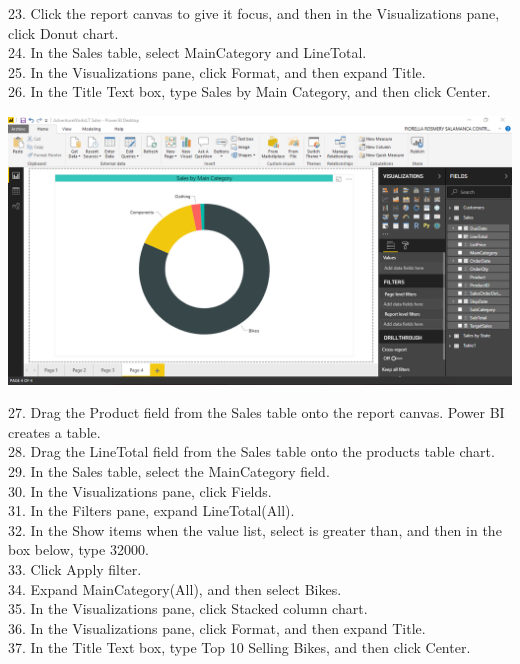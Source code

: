 23. Click the report canvas to give it focus, and then in the Visualizations pane, click Donut chart.\\
24. In the Sales table, select MainCategory and LineTotal.\\
25. In the Visualizations pane, click Format, and then expand Title.\\
26. In the Title Text box, type Sales by Main Category, and then click Center.\\

	\begin{center}
	\includegraphics[width=17cm]{./Imagenes/Ejercicio2/Tarea1/4}
	\end{center}	

27. Drag the Product field from the Sales table onto the report canvas. Power BI creates a table.\\
28. Drag the LineTotal field from the Sales table onto the products table chart.\\
29. In the Sales table, select the MainCategory field.\\
30. In the Visualizations pane, click Fields.\\
31. In the Filters pane, expand LineTotal(All).\\
32. In the Show items when the value list, select is greater than, and then in the box below, type
32000.\\
33. Click Apply filter.\\
34. Expand MainCategory(All), and then select Bikes.\\
35. In the Visualizations pane, click Stacked column chart.\\
36. In the Visualizations pane, click Format, and then expand Title.\\
37. In the Title Text box, type Top 10 Selling Bikes, and then click Center.\\


